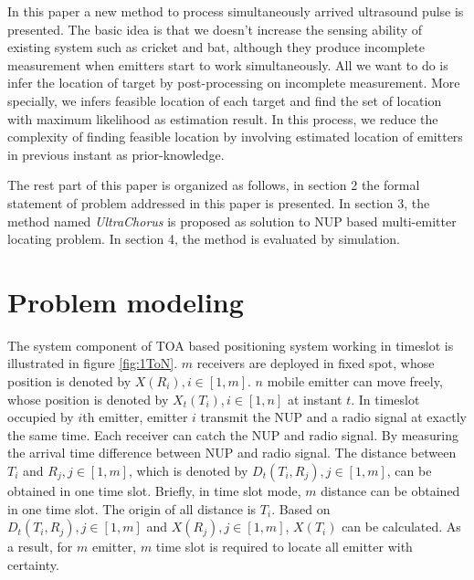 \documentclass[conference]{IEEEtran}
\begin{document}
In this paper a new method to process simultaneously arrived ultrasound pulse is
presented.  The basic idea is that we doesn't increase the sensing ability of existing
system such as cricket and bat, although they produce incomplete  measurement when
emitters start to work simultaneously. All we want to do is infer the location of target
by post-processing on incomplete measurement.  More specially, we infers feasible
location of each target and find the set of location with maximum likelihood as
estimation result. In this process, we reduce the complexity of finding feasible
location by involving estimated location of emitters in previous instant as
prior-knowledge. 

The rest part of this paper is organized as follows, in section 2 the formal statement
of problem addressed in this paper is presented. In section 3, the method named
\emph{UltraChorus} is proposed as solution to NUP based multi-emitter locating problem. 
In section 4, the method is evaluated by simulation.
\section{Problem modeling}
The system component of TOA based positioning system working in timeslot is illustrated in
figure \ref{fig:1ToN}. $m$ receivers are deployed in fixed spot, whose position is denoted
by $X(R_i),i\in[1,m]$. $n$ mobile emitter can move freely, whose position is denoted
by $X_t(T_i),i\in[1,n]$ at instant $t$. In timeslot occupied by $i$th emitter, emitter
$i$ transmit the NUP and a radio signal at exactly the same time. Each receiver can catch
the NUP and radio signal. By measuring the arrival time difference between NUP and radio signal.
The distance between $T_i$ and $R_j,j\in[1,m]$, which is denoted by
$D_t(T_i,R_j),j\in[1,m]$, can be obtained in one time slot. Briefly, in time slot mode,
$m$ distance can be obtained in one time slot. The origin of all distance is $T_i$.
Based on $D_t(T_i,R_j),j\in[1,m]$ and $X(R_j),j\in[1,m]$, $X(T_i)$ can be calculated. 
As a result, for $m$ emitter, $m$ time slot is required to locate all emitter with
certainty.
\end{document}
